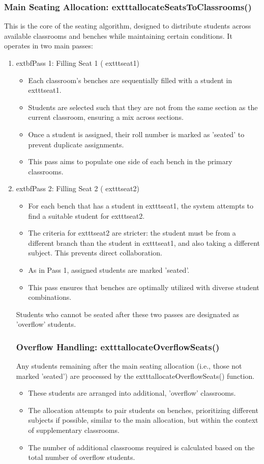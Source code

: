\documentclass{article}
\begin{document}
\subsubsection{Main Seating Allocation: 	exttt{allocateSeatsToClassrooms()}}
This is the core of the seating algorithm, designed to distribute students across available classrooms and benches while maintaining certain conditions. It operates in two main passes:
\begin{enumerate}
    \item 	extbf{Pass 1: Filling Seat 1 (	exttt{seat1})}
    \begin{itemize}
        \item Each classroom's benches are sequentially filled with a student in 	exttt{seat1}.
        \item Students are selected such that they are not from the same section as the current classroom, ensuring a mix across sections.
        \item Once a student is assigned, their roll number is marked as 'seated' to prevent duplicate assignments.
        \item This pass aims to populate one side of each bench in the primary classrooms.
    \end{itemize}
    \item 	extbf{Pass 2: Filling Seat 2 (	exttt{seat2})}
    \begin{itemize}
        \item For each bench that has a student in 	exttt{seat1}, the system attempts to find a suitable student for 	exttt{seat2}.
        \item The criteria for 	exttt{seat2} are stricter: the student must be from a different branch than the student in 	exttt{seat1}, and also taking a different subject. This prevents direct collaboration.
        \item As in Pass 1, assigned students are marked 'seated'.
        \item This pass ensures that benches are optimally utilized with diverse student combinations.
    \end{itemize}
Students who cannot be seated after these two passes are designated as 'overflow' students.

\subsubsection{Overflow Handling: 	exttt{allocateOverflowSeats()}}
Any students remaining after the main seating allocation (i.e., those not marked 'seated') are processed by the 	exttt{allocateOverflowSeats()} function.
\begin{itemize}
    \item These students are arranged into additional, 'overflow' classrooms.
    \item The allocation attempts to pair students on benches, prioritizing different subjects if possible, similar to the main allocation, but within the context of supplementary classrooms.
    \item The number of additional classrooms required is calculated based on the total number of overflow students.
\end{itemize}


\end{enumerate}
\end{document}
